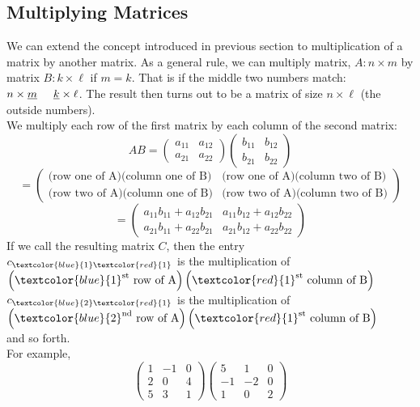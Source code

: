 \documentclass{ximera}
\begin{document}
\subsection{Multiplying Matrices}
We can extend the concept introduced in previous section to multiplication of a matrix by another matrix. As a general rule, we can multiply matrix, $A: n \times m$ by matrix $B: k \times \ell$ if $m=k$. That is if the middle two numbers match: $n\times \underline{m} \hspace{.5cm} \underline{k} \times \ell$. The result then turns out to be a matrix of size $n\times \ell$ (the outside numbers). \\
We multiply each row of the first matrix by each column of the second matrix:
\[ AB = \left(\begin{array}{cc}
a_{11} & a_{12}\\
a_{21} & a_{22}
\end{array}\right) \left(\begin{array}{cc}
b_{11} & b_{12}\\
b_{21} & b_{22}
\end{array}\right) 
\]
\[ = \left(\begin{array}{cc}
\text{(row one of A)(column one of B)} & \text{(row one of A)(column two of B)}\\
\text{(row two of A)(column one of B)} & \text{(row two of A)(column two of B)}
\end{array}\right) \]
\[ = \left(\begin{array}{cc}
a_{11}b_{11} + a_{12}b_{21} & a_{11}b_{12}+ a_{12}b_{22}\\
a_{21}b_{11} + a_{22}b_{21} & a_{21}b_{12} + a_{22}b_{22}
\end{array}\right)\]
If we call the resulting matrix $C$, then the entry \\
$c_{\textcolor{blue}{1}\textcolor{red}{1}}$ is the multiplication of $\left(\textcolor{blue}{1}^{\text{st}} \text{ row of A}\right)\left( \textcolor{red}{1}^{\text{st}} \text{ column of B}\right)$\\
$c_{\textcolor{blue}{2} \textcolor{red}{1}}$ is the multiplication of $\left(\textcolor{blue}{2}^{\text{nd}} \text{ row of A}\right)\left( \textcolor{red}{1}^{\text{st}} \text{ column of B}\right)$\\
and so forth. \\
For example, 
\[\left(\begin{array}{ccc}
1 & -1 & 0\\
2 & 0 & 4 \\
5 & 3 & 1
\end{array}\right) \left(\begin{array}{ccc} 
5 & 1 & 0\\
-1 & -2 & 0\\
1 & 0 & 2
\end{array}\right)\]
\end{document}
